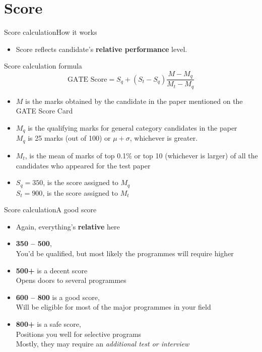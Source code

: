 \documentclass[handout]{beamer}
\begin{document}
\section{Score}
\begin{frame}{Score calculation}{How it works}
    \begin{itemize}
        \item Score reflects candidate's \textbf{relative performance} level.
    \end{itemize}

    \begin{block}{Score calculation formula}
        \begin{equation*}
            \text{GATE Score} = S_{q} + (S_{t} - S_{q}) {\frac {M - M_{q}}{{M}_{t} - M_{q}}}
        \end{equation*}
    \end{block}

    \begin{itemize}
        \item $M$ is the marks obtained by the candidate in the paper mentioned on the GATE Score Card
        \item $M_{q}$ is the qualifying marks for general category candidates in the paper \\
              $M_{q}$ is 25 marks (out of 100) or $\mu + \sigma$, whichever is greater.
        \item $M_{t}$, is the mean of marks of top 0.1\% or top 10 (whichever is larger) of all the candidates who appeared for the test paper
        \item $S_{q} = 350$, is the score assigned to $M_{q}$ \\
              $S_{t} = 900$, is the score assigned to $M_{t}$
    \end{itemize}
\end{frame}

\begin{frame}{Score calculation}{A good score}
    \begin{itemize}
        \item Again, everything's \textbf{relative} here
        \item \textbf{350  -- 500}, \\
              You'd be qualified, but most likely the programmes will require higher
        \item \textbf{500+} is a decent score \\
              Opens doors to several programmes
        \item \textbf{600 -- 800} is a good score, \\
              Will be eligible for most of the major programmes in your field
        \item \textbf{800+} is a safe score, \\
              Positions you well for selective programs \\
              Mostly, they may require an \emph{additional test or interview}
    \end{itemize}
\end{frame}
\end{document}

